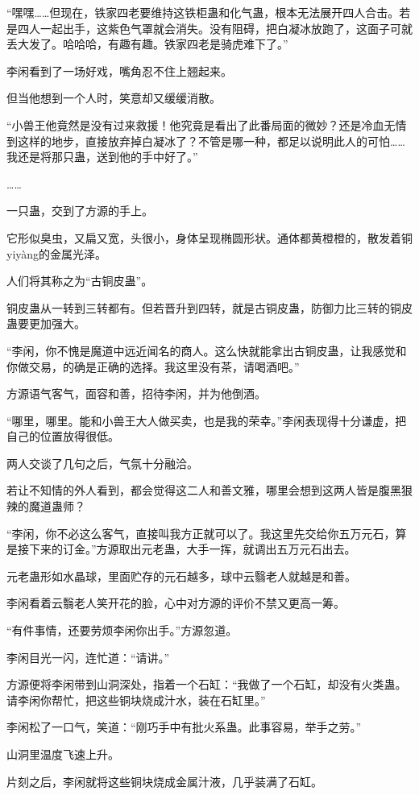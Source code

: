 \begin{this_body}
“嘿嘿……但现在，铁家四老要维持这铁柜蛊和化气蛊，根本无法展开四人合击。若是四人一起出手，这紫色气罩就会消失。没有阻碍，把白凝冰放跑了，这面子可就丢大发了。哈哈哈，有趣有趣。铁家四老是骑虎难下了。”

李闲看到了一场好戏，嘴角忍不住上翘起来。

但当他想到一个人时，笑意却又缓缓消散。

“小兽王他竟然是没有过来救援！他究竟是看出了此番局面的微妙？还是冷血无情到这样的地步，直接放弃掉白凝冰了？不管是哪一种，都足以说明此人的可怕……我还是将那只蛊，送到他的手中好了。”

……

一只蛊，交到了方源的手上。

它形似臭虫，又扁又宽，头很小，身体呈现椭圆形状。通体都黄橙橙的，散发着铜yiyàng的金属光泽。

人们将其称之为“古铜皮蛊”。

铜皮蛊从一转到三转都有。但若晋升到四转，就是古铜皮蛊，防御力比三转的铜皮蛊要更加强大。

“李闲，你不愧是魔道中远近闻名的商人。这么快就能拿出古铜皮蛊，让我感觉和你做交易，的确是正确的选择。我这里没有茶，请喝酒吧。”

方源语气客气，面容和善，招待李闲，并为他倒酒。

“哪里，哪里。能和小兽王大人做买卖，也是我的荣幸。”李闲表现得十分谦虚，把自己的位置放得很低。

两人交谈了几句之后，气氛十分融洽。

若让不知情的外人看到，都会觉得这二人和善文雅，哪里会想到这两人皆是腹黑狠辣的魔道蛊师？

“李闲，你不必这么客气，直接叫我方正就可以了。我这里先交给你五万元石，算是接下来的订金。”方源取出元老蛊，大手一挥，就调出五万元石出去。

元老蛊形如水晶球，里面贮存的元石越多，球中云翳老人就越是和善。

李闲看着云翳老人笑开花的脸，心中对方源的评价不禁又更高一筹。

“有件事情，还要劳烦李闲你出手。”方源忽道。

李闲目光一闪，连忙道：“请讲。”

方源便将李闲带到山洞深处，指着一个石缸：“我做了一个石缸，却没有火类蛊。请李闲你帮忙，把这些铜块烧成汁水，装在石缸里。”

李闲松了一口气，笑道：“刚巧手中有批火系蛊。此事容易，举手之劳。”

山洞里温度飞速上升。

片刻之后，李闲就将这些铜块烧成金属汁液，几乎装满了石缸。


\end{this_body}
